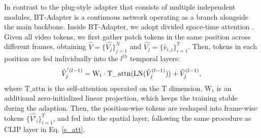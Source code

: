 \documentclass{article} \usepackage{iclr2024_conference,times}
\begin{document}
In contrast to the plug-style adapter that consists of multiple independent modules, BT-Adapter is a continuous network operating as a branch alongside the main backbone. Inside BT-Adapter, we adopt divided space-time attention \citep{bertasius2021space}. Given all video tokens, we first gather patch tokens in the same position across different frames, obtaining $\hat{V} = \{\hat{V_j}\}_{j=1}^N$ and $\hat{V_j} = \{\hat{v}_{i,j}\}_{i=1}^T$. Then, tokens in each position are fed individually into the $l^{th}$ temporal layers:
\begin{equation}
    \hat{V}_j^{'(l-1)} = \mathrm{W_t} \cdot  \mathrm{T\_attn}(\mathrm{LN}(\hat{V}_j^{(l-1)})) + \hat{V}_j^{(l-1)}, \\  
\end{equation}
where $\mathrm{T\_attn}$ is the self-attention operated on the T dimension. $\mathrm{W_t}$ is an additional zero-initialized linear projection, which keeps the training stable during the adaption. Then, the position-wise tokens are reshaped into frame-wise tokens $\{\hat{V'}_i\}_{i=1}^T$, and fed into the spatial layer, following the same procedure as CLIP layer in Eq. \ref{s_att}.
\end{document}
